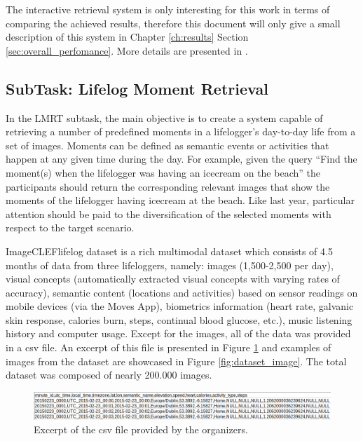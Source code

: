 The interactive retrieval system is only interesting for this work in terms of comparing the achieved results, therefore this document will only give a small description of this system in Chapter \ref{ch:results} Section \ref{sec:overall_perfomance}. More details are presented in \cite{Ribeiro2020}.

    \subsection{SubTask: Lifelog Moment Retrieval}
    In the LMRT subtask, the main objective is to create a system capable of retrieving a number of predefined moments in a lifelogger’s day-to-day life from a set of images. Moments can be defined as semantic events or activities that happen at any given time during the day. For example, given the query “Find the moment(s) when the lifelogger was having an icecream on the beach” the participants should return the corresponding relevant images that show the moments of the lifelogger having icecream at the beach. Like last year, particular attention should be paid to the diversification of the selected moments with respect to the target scenario.

    ImageCLEFlifelog dataset is a rich multimodal dataset which consists of 4.5 months of data from three lifeloggers, namely: images (1,500-2,500 per day), visual concepts (automatically extracted visual concepts with varying rates of accuracy), semantic content (locations and activities) based on sensor readings on mobile devices (via the Moves App), biometrics information (heart rate, galvanic skin response, calories burn, steps, continual blood glucose, etc.), music listening history and computer usage. 
    Except for the images, all of the data was provided in a csv file. An excerpt of this file is presented in Figure \ref{fig:dataset_csv} and examples of images from the dataset are showcased in Figure \ref{fig:dataset_image}. The total dataset was composed of nearly 200.000 images.

    \begin{figure}[htb]
        
        \centering
 
        \captionsetup{justification=centering}
        \includegraphics[width =  \textwidth]{Sections/5ImageClef/images/dataset.png}
        \caption[Provided csv file.]{Excerpt of the csv file provided by the organizers.}  
       \label{fig:dataset_csv}
    \end{figure}


